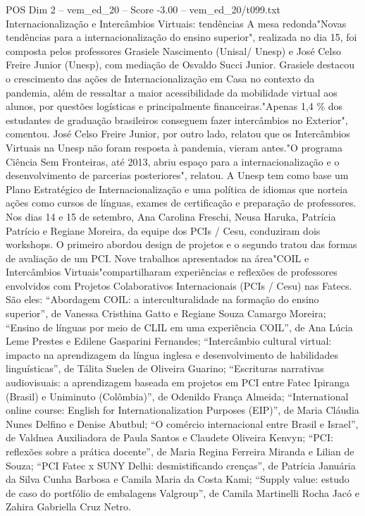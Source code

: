 \begin{textsample}{POS Dim 2 – vem\_ed\_20 – Score -3.00 – vem\_ed\_20/t099.txt}  \label{ex:f2_pos_069}
Internacionalização e Intercâmbios Virtuais: tendências A mesa redonda"Novas tendências para a internacionalização do ensino superior", realizada no dia 15, foi composta pelos professores Grasiele Nascimento (Unisal/ Unesp) e José Celso Freire Junior (Unesp), com mediação de Osvaldo Succi Junior.
Grasiele destacou o crescimento das ações de Internacionalização em Casa no contexto da pandemia, além de ressaltar a maior acessibilidade da mobilidade virtual aos alunos, por questões logísticas e principalmente financeiras."Apenas 1,4 \% dos estudantes de graduação brasileiros conseguem fazer intercâmbios no Exterior", comentou.
José Celso Freire Junior, por outro lado, relatou que os Intercâmbios Virtuais na Unesp não foram resposta à pandemia, vieram antes."O programa Ciência Sem Fronteiras, até 2013, abriu espaço para a internacionalização e o desenvolvimento de parcerias posteriores", relatou.
A Unesp tem como base um Plano Estratégico de Internacionalização e uma política de idiomas que norteia ações como cursos de línguas, exames de certificação e preparação de professores.
Nos dias 14 e 15 de setembro, Ana Carolina Freschi, Neusa Haruka, Patrícia Patrício e Regiane Moreira, da equipe dos PCIs / Cesu, conduziram dois workshops.
O primeiro abordou design de projetos e o segundo tratou das formas de avaliação de um PCI.
Nove trabalhos apresentados na área"COIL e Intercâmbios Virtuais"compartilharam experiências e reflexões de professores envolvidos com Projetos Colaborativos Internacionais (PCIs / Cesu) nas Fatecs.
São eles: “Abordagem COIL: a interculturalidade na formação do ensino superior”, de Vanessa Cristhina Gatto e Regiane Souza Camargo Moreira; “Ensino de línguas por meio de CLIL em uma experiência COIL”, de Ana Lúcia Leme Prestes e Edilene Gasparini Fernandes; “Intercâmbio cultural virtual: impacto na aprendizagem da língua inglesa e desenvolvimento de habilidades linguísticas”, de Tálita Suelen de Oliveira Guarino; “Escrituras narrativas audiovisuais: a aprendizagem baseada em projetos em PCI entre Fatec Ipiranga (Brasil) e Uniminuto (Colômbia)”, de Odenildo França Almeida; “International online course: English for Internationalization Purposes (EIP)”, de Maria Cláudia Nunes Delfino e Denise Abutbul; “O comércio internacional entre Brasil e Israel”, de Valdnea Auxiliadora de Paula Santos e Claudete Oliveira Kenvyn; “PCI: reflexões sobre a prática docente”, de Maria Regina Ferreira Miranda e Lilian de Souza; “PCI Fatec x SUNY Delhi: desmistificando crenças”, de Patrícia Januária da Silva Cunha Barbosa e Camila Maria da Costa Kami; “Supply value: estudo de caso do portfólio de embalagens Valgroup”, de Camila Martinelli Rocha Jacó e Zahira Gabriella Cruz Netro.

\end{textsample}
